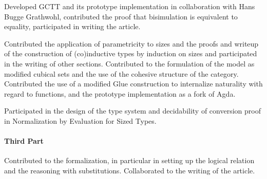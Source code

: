 \documentclass{book}
\begin{document}
Developed GCTT and its prototype implementation in collaboration with
Hans Bugge Grathwohl, contributed the proof that bisimulation is
equivalent to equality, participated in writing the article.

Contributed the application of parametricity to sizes and the proofs
and writeup of the construction of (co)inductive types by induction on
sizes and participated in the writing of other sections. Contributed
to the formulation of the model as modified cubical sets and the use
of the cohesive structure of the category. Contributed the use of a
modified Glue construction to internalize naturality with regard to
functions, and the prototype implementation as a fork of Agda.

Participated in the design of the type system and decidability of
conversion proof in Normalization by Evaluation for Sized Types.
\paragraph{Third Part}
Contributed to the formalization, in particular in setting up the
logical relation and the reasoning with substitutions. Collaborated
to the writing of the article.


\end{document}
